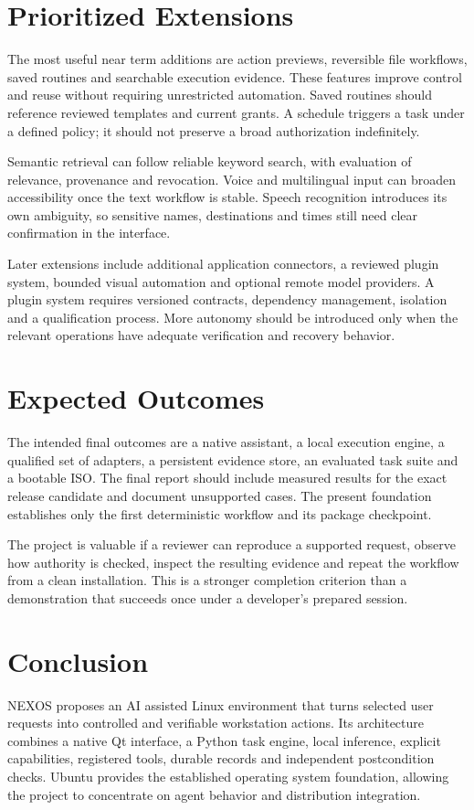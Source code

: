 \section{Prioritized Extensions}
The most useful near term additions are action previews, reversible file workflows, saved routines and searchable execution evidence. These features improve control and reuse without requiring unrestricted automation. Saved routines should reference reviewed templates and current grants. A schedule triggers a task under a defined policy; it should not preserve a broad authorization indefinitely.

Semantic retrieval can follow reliable keyword search, with evaluation of relevance, provenance and revocation. Voice and multilingual input can broaden accessibility once the text workflow is stable. Speech recognition introduces its own ambiguity, so sensitive names, destinations and times still need clear confirmation in the interface.

Later extensions include additional application connectors, a reviewed plugin system, bounded visual automation and optional remote model providers. A plugin system requires versioned contracts, dependency management, isolation and a qualification process. More autonomy should be introduced only when the relevant operations have adequate verification and recovery behavior.

\section{Expected Outcomes}
The intended final outcomes are a native assistant, a local execution engine, a qualified set of adapters, a persistent evidence store, an evaluated task suite and a bootable ISO. The final report should include measured results for the exact release candidate and document unsupported cases. The present foundation establishes only the first deterministic workflow and its package checkpoint.

The project is valuable if a reviewer can reproduce a supported request, observe how authority is checked, inspect the resulting evidence and repeat the workflow from a clean installation. This is a stronger completion criterion than a demonstration that succeeds once under a developer's prepared session.

\section{Conclusion}
NEXOS proposes an AI assisted Linux environment that turns selected user requests into controlled and verifiable workstation actions. Its architecture combines a native Qt interface, a Python task engine, local inference, explicit capabilities, registered tools, durable records and independent postcondition checks. Ubuntu provides the established operating system foundation, allowing the project to concentrate on agent behavior and distribution integration.

